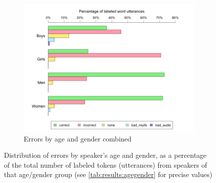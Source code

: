 			
			\begin{figure}[ptb]
				\centering
								
				\begin{subfigure}{\textwidth}
					\centering
					\includegraphics[width=\textwidth]{img/plots/judgmentsAgeGender}
					\caption{Errors by age and gender combined}
					\label{fig:agegenderbars:4groups}
				\end{subfigure}
				
				\vspace{1.5em}
				
				\caption[Error distribution by speaker age and gender]{Distribution of errors by speaker's age and gender,
				as a percentage of the total number of labeled tokens (utterances) from speakers of that age/gender group
				(see \cref{tab:results:agegender} for precise values)
				}
				\ContinuedFloat
				
				\label{fig:results:agegenderbars}
			\end{figure}
			
